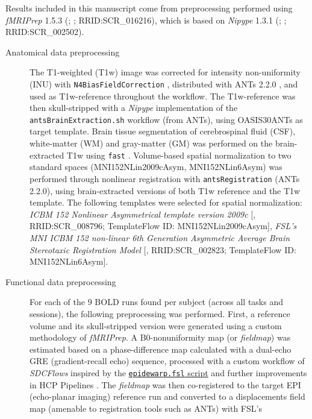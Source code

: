\documentclass[]{article}
\date{}
\begin{document}
Results included in this manuscript come from preprocessing performed
using \emph{fMRIPrep} 1.5.3 (\citet{fmriprep1}; \citet{fmriprep2};
RRID:SCR\_016216), which is based on \emph{Nipype} 1.3.1
(\citet{nipype1}; \citet{nipype2}; RRID:SCR\_002502).

\begin{description}
\item[Anatomical data preprocessing]
The T1-weighted (T1w) image was corrected for intensity non-uniformity
(INU) with \texttt{N4BiasFieldCorrection} \citep{n4}, distributed with
ANTs 2.2.0 \citep[RRID:SCR\_004757]{ants}, and used as T1w-reference
throughout the workflow. The T1w-reference was then skull-stripped with
a \emph{Nipype} implementation of the \texttt{antsBrainExtraction.sh}
workflow (from ANTs), using OASIS30ANTs as target template. Brain tissue
segmentation of cerebrospinal fluid (CSF), white-matter (WM) and
gray-matter (GM) was performed on the brain-extracted T1w using
\texttt{fast} \citep[FSL 5.0.9, RRID:SCR\_002823,][]{fsl_fast}.
Volume-based spatial normalization to two standard spaces
(MNI152NLin2009cAsym, MNI152NLin6Asym) was performed through nonlinear
registration with \texttt{antsRegistration} (ANTs 2.2.0), using
brain-extracted versions of both T1w reference and the T1w template. The
following templates were selected for spatial normalization: \emph{ICBM
152 Nonlinear Asymmetrical template version 2009c}
{[}\citet{mni152nlin2009casym}, RRID:SCR\_008796; TemplateFlow ID:
MNI152NLin2009cAsym{]}, \emph{FSL's MNI ICBM 152 non-linear 6th
Generation Asymmetric Average Brain Stereotaxic Registration Model}
{[}\citet{mni152nlin6asym}, RRID:SCR\_002823; TemplateFlow ID:
MNI152NLin6Asym{]}.
\item[Functional data preprocessing]
For each of the 9 BOLD runs found per subject (across all tasks and
sessions), the following preprocessing was performed. First, a reference
volume and its skull-stripped version were generated using a custom
methodology of \emph{fMRIPrep}. A B0-nonuniformity map (or
\emph{fieldmap}) was estimated based on a phase-difference map
calculated with a dual-echo GRE (gradient-recall echo) sequence,
processed with a custom workflow of \emph{SDCFlows} inspired by the
\href{http://www.nmr.mgh.harvard.edu/~greve/fbirn/b0/epidewarp.fsl}{\texttt{epidewarp.fsl}
script} and further improvements in HCP Pipelines \citep{hcppipelines}.
The \emph{fieldmap} was then co-registered to the target EPI
(echo-planar imaging) reference run and converted to a displacements
field map (amenable to registration tools such as ANTs) with FSL's

\end{description}
\end{document}
